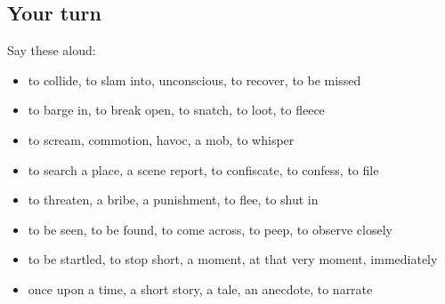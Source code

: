 \subsection*{Your turn}
Say these aloud:

\begin{itemize}
\raggedright
  \item to collide, to slam into, unconscious, to recover, to be missed
  \item to barge in, to break open, to snatch, to loot, to fleece
  \item to scream, commotion, havoc, a mob, to whisper
  \item to search a place, a scene report, to confiscate, to confess, to file
  \item to threaten, a bribe, a punishment, to flee, to shut in
  \item to be seen, to be found, to come across, to peep, to observe closely
  \item to be startled, to stop short, a moment, at that very moment, immediately
  \item once upon a time, a short story, a tale, an anecdote, to narrate
\end{itemize}

